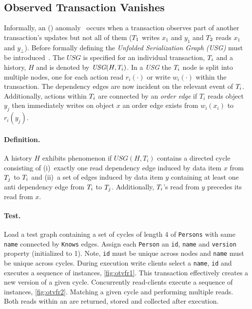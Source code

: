 \subsection{Observed Transaction Vanishes}
\label{sec:observ-trans-vanish}
Informally, an  () anomaly~\cite{DBLP:journals/pvldb/BailisDFGHS13} occurs when a transaction observes part of another transaction's updates but not all of them (\eg $T_1$ writes $x_1$ and $y_1$ and $T_2$ reads $x_1$ and $y_\bot$).
Before formally defining  the \emph{Unfolded Serialization Graph (USG)} must be introduced~\cite{adya1999weak}.
The $\textit{USG}$ is specified for an individual transaction, $T_i$ and a history, $H$ and is denoted by $\textit{USG}(H,T_i)$.
In a \emph{USG} the $T_i$ node is split into multiple nodes, one for each action read $r_i(\cdot)$ or  write $w_i(\cdot)$  within the transaction.
The dependency edges are now incident on the relevant event of $T_i$.
Additionally, actions within $T_i$ are connected by  an \emph{order edge} \eg if $T_i$ reads object $y_j$ then immediately writes on object $x$ an order edge exists from $w_i(x_i)$ to $r_i(y_j)$.

\paragraph{Definition.}
A history $H$ exhibits phenomenon  if $\textit{USG}(H,T_i)$ contains a directed cycle consisting of
(i)~exactly one read dependency edge induced by data item $x$ from $T_j$ to $T_i$ and
(ii)~a set of edges induced by data item $y$ containing at least one anti dependency edge from $T_i$ to $T_j$.
Additionally, $T_i$'s read from $y$ precedes its read from $x$.

\paragraph{Test.}
Load a test graph containing a set of cycles of length 4 of \texttt{Persons} with same \texttt{name} connected by \texttt{Knows} edges.
Assign each \texttt{Person} an \texttt{id}, \texttt{name} and \texttt{version} property (initialized to 1).
Note, \texttt{id} must be unique across nodes and \texttt{name} must be unique across cycles.
During execution write clients select a \texttt{name}, \texttt{id} and executes a sequence of  instances, \autoref{fig:otvfr1}.
This transaction effectively creates a new version of a given cycle.
Concurrently read-clients execute a sequence of  instances, \autoref{fig:otvfr2}.
Matching a given cycle and performing multiple reads.
Both reads within an  are returned, stored and collected after execution.

